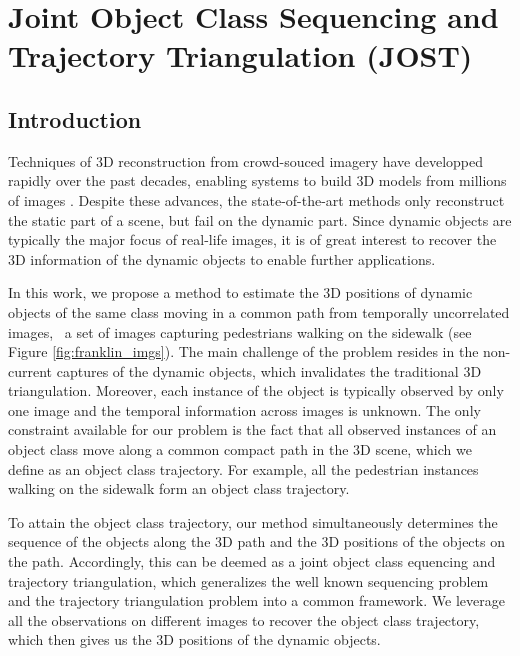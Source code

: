\chapter{Joint Object Class Sequencing and Trajectory Triangulation (JOST)} \label{ch:jost}

\section{Introduction}

Techniques of 3D reconstruction from crowd-souced imagery have developped rapidly over the past decades, enabling systems to build 3D models from millions of images \cite{agarwal2011building,Frahm2010,zheng2014patchmatch,Heinly}. 
Despite these advances, the state-of-the-art methods only reconstruct the static part of a scene, but fail on the dynamic part. 
Since dynamic objects are typically the major focus of real-life images, it is of great interest to recover the 3D information of the dynamic objects to enable further applications.

In this work, we propose a method to estimate the 3D positions of dynamic objects of the same class moving in a common path from temporally uncorrelated images, \eg~a set of images capturing pedestrians walking on the sidewalk (see Figure \ref{fig:franklin_imgs}). 
The main challenge of the problem resides in the non-current captures of the dynamic objects, which invalidates the traditional 3D triangulation. 
Moreover, each instance of the object is typically observed by only one image and the temporal information across images is unknown. The only constraint available for our problem is the fact that all observed instances of an object class move along a common compact path in the 3D scene, which we define as an object class trajectory. For example, all the pedestrian instances walking on the sidewalk form an object class trajectory.

To attain the object class trajectory, our method simultaneously determines the sequence of the objects along the 3D path and the 3D positions of the objects on the path. Accordingly, this can be deemed as a joint object class equencing and trajectory triangulation, which generalizes the well known sequencing problem \cite{Basha_ECCV2012,Basha_ICCV2013} and the trajectory triangulation problem \cite{Valmadre_CVPR2012,ZhuCL_CVPR11,Park_ECCV2010} into a common framework. We leverage all the observations on different images to recover the object class trajectory, which then gives us the 3D positions of the dynamic objects.

